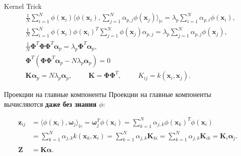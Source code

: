 \begin{frame}[allowframebreaks]{Kernel Trick}
    \begin{align*}
         & \frac{1}{N}\sum_{i=1}^N\phi(\boldsymbol{x}_i)\langle\phi(\boldsymbol{x}_i), \sum_{j=1}^N\alpha_{p,j}\phi(\boldsymbol{x}_j)\rangle_{\mathbb{H}} = \lambda_p\sum_{i=1}^N\alpha_{p,i}\phi(\boldsymbol{x}_i), \\
         & \frac{1}{N}\sum_{i=1}^N\phi(\boldsymbol{x}_i)\phi(\boldsymbol{x}_i)^T\sum_{j=1}^N\phi(\boldsymbol{x}_j)\alpha_{p,j} = \lambda_p\sum_{j=1}^N\alpha_{p,j}\phi(\boldsymbol{x}_j),                            \\
         & \frac{1}{N}\boldsymbol{\Phi}^T\boldsymbol{\Phi}\boldsymbol{\Phi}^T\boldsymbol{\alpha}_p = \lambda_p\boldsymbol{\Phi}^T\boldsymbol{\alpha}_p,                                                              \\
         & \boldsymbol{\Phi}^T(\boldsymbol{\Phi}\boldsymbol{\Phi}^T\boldsymbol{\alpha}_p - N\lambda_p\boldsymbol{\alpha}_p) = 0                                                                                      \\
         & \mathbf{K}\boldsymbol{\alpha}_p = N\lambda_p\boldsymbol{\alpha}_p, \hspace{1cm} \mathbf{K} = \boldsymbol{\Phi}\boldsymbol{\Phi}^T, \hspace{1cm} K_{ij} = k(\boldsymbol{x}_i, \boldsymbol{x}_j).
    \end{align*}
\end{frame}

\begin{frame}{Проекции на главные компоненты}
    Проекции на главные компоненты вычисляются \textbf{даже без знания $\phi$}:

    \begin{align*}
        \boldsymbol{z}_{ij} & = \langle\phi(\boldsymbol{x}_i), \mathbf{\omega}_j\rangle_{\mathbb{H}} = \boldsymbol{\omega}_j^T\phi(\boldsymbol{x}_i) = \sum_{k=1}^N\alpha_{j,k}\phi(\boldsymbol{x}_k)^T\phi(\boldsymbol{x}_i) \\
                            & = \sum_{k=1}^N\alpha_{j,k}k(\boldsymbol{x}_k, \boldsymbol{x}_i) = \sum_{k=1}^N\alpha_{j,k}\mathbf{K}_{ki} = \sum_{k=1}^N\alpha_{j,k}\mathbf{K}_{ik} = \mathbf{K}_i\boldsymbol{\alpha}_j. \\ \\
        \mathbf{Z}         & = \mathbf{K}\boldsymbol{\mathbf{\alpha}}.
    \end{align*}

\end{frame}

